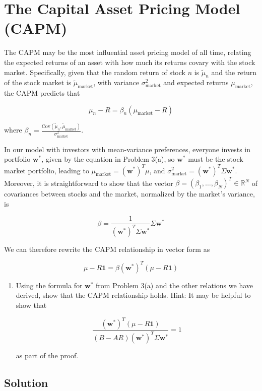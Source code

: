 \documentclass{article}
\begin{document}
\newpage
\section{The Capital Asset Pricing Model (CAPM)}

The CAPM may be the most influential asset pricing model of all time, relating the expected returns of an asset with how much its returns covary with the stock market. Specifically, given that the random return of stock $n$ is $\tilde{\mu}_n$ and the return of the stock market is $\tilde{\mu}_{\text{market}}$, with variance $\sigma_{\text{market}}^2$ and expected returns $\mu_{\text{market}}$, the CAPM predicts that

\[
\mu_n - R = \beta_n (\mu_{\text{market}} - R)
\]

where $\beta_n = \frac{\text{Cov}(\tilde{\mu}_n, \tilde{\mu}_{\text{market}})}{\sigma_{\text{market}}^2}$.

In our model with investors with mean-variance preferences, everyone invests in portfolio $\mathbf{w}^*$, given by the equation in Problem 3(a), so $\mathbf{w}^*$ must be the stock market portfolio, leading to $\mu_{\text{market}} = (\mathbf{w}^*)^T \mu$, and $\sigma_{\text{market}}^2 = (\mathbf{w}^*)^T \Sigma \mathbf{w}^*$. Moreover, it is straightforward to show that the vector $\beta = (\beta_1, \ldots, \beta_N)^T \in \mathbb{R}^N$ of covariances between stocks and the market, normalized by the market's variance, is

\[
\beta = \frac{1}{(\mathbf{w}^*)^T \Sigma \mathbf{w}^*} \Sigma \mathbf{w}^*
\]

We can therefore rewrite the CAPM relationship in vector form as

\[
\mu - R \mathbf{1} = \beta (\mathbf{w}^*)^T (\mu - R \mathbf{1})
\]

\begin{enumerate}

\item[(a)] Using the formula for $\mathbf{w}^*$ from Problem 3(a) and the other relations we have derived, show that the CAPM relationship holds. Hint: It may be helpful to show that

\[
\frac{(\mathbf{w}^*)^T (\mu - R \mathbf{1})}{(B - AR) (\mathbf{w}^*)^T \Sigma \mathbf{w}^*} = 1
\]

as part of the proof.

\end{enumerate}

\subsection*{Solution}
\end{document}
